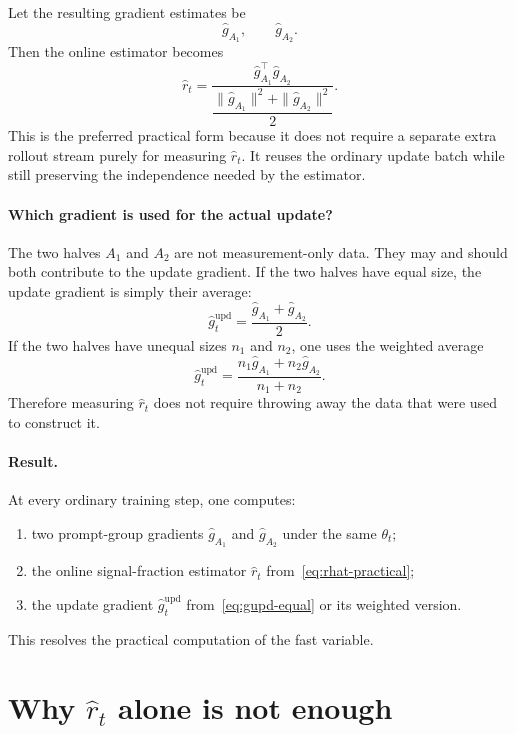 \documentclass[11pt]{article}
\begin{document}
Let the resulting gradient estimates be
\[
\hat g_{A_1},
\qquad
\hat g_{A_2}.
\]
Then the online estimator becomes
\begin{equation}
\hat r_t
=
\frac{\hat g_{A_1}^\top \hat g_{A_2}}{\dfrac{\|\hat g_{A_1}\|^2 + \|\hat g_{A_2}\|^2}{2}}.
\label{eq:rhat-practical}
\end{equation}
This is the preferred practical form because it does not require a separate extra rollout stream purely for measuring $\hat r_t$. It reuses the ordinary update batch while still preserving the independence needed by the estimator.

\paragraph{Which gradient is used for the actual update?}
The two halves $A_1$ and $A_2$ are not measurement-only data. They may and should both contribute to the update gradient. If the two halves have equal size, the update gradient is simply their average:
\begin{equation}
\hat g_t^{\mathrm{upd}}
=
\frac{\hat g_{A_1}+\hat g_{A_2}}{2}.
\label{eq:gupd-equal}
\end{equation}
If the two halves have unequal sizes $n_1$ and $n_2$, one uses the weighted average
\[
\hat g_t^{\mathrm{upd}}
=
\frac{n_1\hat g_{A_1}+n_2\hat g_{A_2}}{n_1+n_2}.
\]
Therefore measuring $\hat r_t$ does not require throwing away the data that were used to construct it.

\paragraph{Result.}
At every ordinary training step, one computes:
\begin{enumerate}
    \item two prompt-group gradients $\hat g_{A_1}$ and $\hat g_{A_2}$ under the same $\theta_t$;
    \item the online signal-fraction estimator $\hat r_t$ from~\eqref{eq:rhat-practical};
    \item the update gradient $\hat g_t^{\mathrm{upd}}$ from~\eqref{eq:gupd-equal} or its weighted version.
\end{enumerate}
This resolves the practical computation of the fast variable.

\section{Why $\hat r_t$ alone is not enough}
\end{document}
